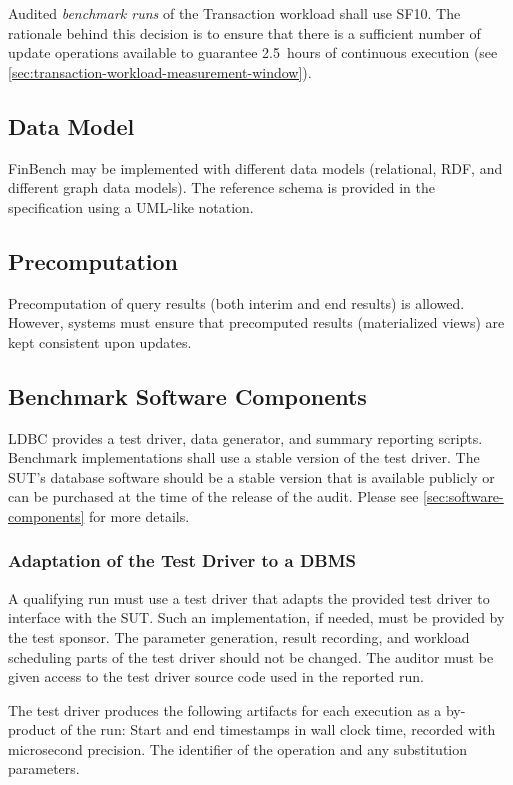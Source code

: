 Audited \emph{benchmark runs} of the Transaction workload shall use SF10. The rationale behind this decision is to ensure that there is a sufficient number of update operations available to guarantee 2.5~hours of continuous execution (see \autoref{sec:transaction-workload-measurement-window}).

\subsection{Data Model}

FinBench may be implemented with different data models (\eg relational, RDF, and different graph data models). The reference schema is provided in the specification using a UML-like notation. 

\subsection{Precomputation}

Precomputation of query results (both interim and end results) is allowed. However, systems must ensure that precomputed results (\eg materialized views) are kept consistent upon updates.

\subsection{Benchmark Software Components}
\label{sec:finbench-software-components}
LDBC provides a test driver, data generator, and summary reporting scripts. Benchmark implementations shall use a stable
version of the test driver. The SUT's database software should be a stable version that is available publicly or can be
purchased at the time of the release of the audit. Please see \autoref{sec:software-components} for more details.

\subsubsection{Adaptation of the Test Driver to a DBMS}
\label{sec:test-driver}
A qualifying run must use a test driver that adapts the provided test driver to interface with the SUT. Such an implementation, if needed, must be provided by the test sponsor. The parameter generation, result recording, and workload scheduling parts of the test driver should not be changed. The auditor must be given access to the test driver source code used in the reported run.

The test driver produces the following artifacts for each execution as a by-product of the run: Start and end timestamps in wall clock time, recorded with microsecond precision. The identifier of the operation and any substitution parameters.


